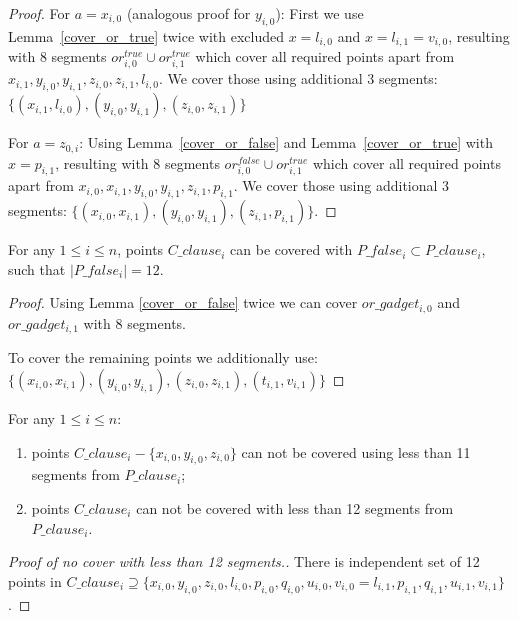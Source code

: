 \begin{proof}
For $a = x_{i, 0}$ (analogous proof for $y_{i, 0}$):
First we use Lemma~\ref{cover_or_true} twice with excluded $x = l_{i, 0}$ and
$x = l_{i, 1} = v_{i, 0}$,
resulting with 8 segments $or^{true}_{i, 0} \cup or^{true}_{i, 1}$
which cover all required points apart from
$x_{i, 1}, y_{i, 0}, y_{i, 1}, z_{i, 0}, z_{i, 1}, l_{i, 0}$.
We cover those using additional 3 segments:
$\{ (x_{i, 1}, l_{i, 0}), (y_{i, 0}, y_{i, 1}),
(z_{i, 0}, z_{i, 1}) \}$

For $a = z_{0, i}$:
Using Lemma~\ref{cover_or_false} and Lemma~\ref{cover_or_true} with
$x = p_{i, 1}$,
resulting with 8 segments $or^{false}_{i, 0} \cup or^{true}_{i, 1}$
which cover all required points apart from
$x_{i, 0}, x_{i, 1}, y_{i, 0}, y_{i, 1}, z_{i, 1}, p_{i, 1}$.
We cover those using additional 3 segments:
$\{ (x_{i, 0}, x_{i, 1}), (y_{i, 0}, y_{i, 1}),
(z_{i, 1}, p_{i, 1}) \}$.
\end{proof}

\begin{lemma}
\label{cover_clauses_solution_false}
For any $1 \le i \le n$,
points $C\_clause_i$ can be covered with $P\_false_i \subset P\_clause_i$,
such that $|P\_false_i| = 12$.
\end{lemma}

\begin{proof}
Using Lemma \ref{cover_or_false} twice we can
cover $or\_gadget_{i,0}$ and  $or\_gadget_{i,1}$
with 8 segments.

To cover the remaining points we additionally use:
$\{ (x_{i, 0}, x_{i, 1}), (y_{i, 0}, y_{i, 1}),
(z_{i, 0}, z_{i, 1}), (t_{i, 1}, v_{i, 1}) \}$

\end{proof}

\begin{lemma}
\label{cover_clauses_segments_no_less}
For any $1 \le i \le n$:
\begin{enumerate}[label={(\arabic*)}]
	\item points $C\_clause_i - \{ x_{i, 0}, y_{i, 0}, z_{i, 0}\}$
	can not be covered using less than 11 segments from $P\_clause_i$;
	\item points $C\_clause_i$ can not be covered with less than
	12 segments from $P\_clause_i$.
\end{enumerate}
\end{lemma}


\begin{proof}[Proof of no cover with less than 12 segments.]
There is independent set of 12 points in $C\_clause_i \supseteq
\{ x_{i, 0}, y_{i, 0}, z_{i, 0}, l_{i, 0}, p_{i, 0}, q_{i, 0},
u_{i, 0}, v_{i, 0} = l_{i, 1}, p_{i, 1}, q_{i, 1}, u_{i, 1}, v_{i, 1} \}$.
\end{proof}

